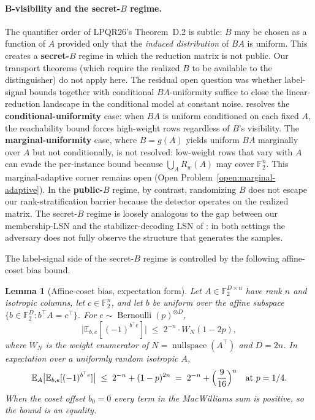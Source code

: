 \documentclass[11pt,a4paper]{article}
\theoremstyle{plain}
\newtheorem{lemma}[theorem]{Lemma}
\theoremstyle{definition}
\newcommand{\F}{\mathbb{F}}
\newcommand{\E}{\mathbb{E}}
\begin{document}
\paragraph{B-visibility and the secret-$B$ regime.} The quantifier order of LPQR26's Theorem~D.2 is subtle: $B$ may be chosen as a function of $A$ provided only that the \emph{induced distribution} of $BA$ is uniform. This creates a \textbf{secret-$B$} regime in which the reduction matrix is not public. Our transport theorems (which require the realized $B$ to be available to the distinguisher) do not apply here.  The residual open question was whether label-signal bounds together with conditional $BA$-uniformity suffice to close the linear-reduction landscape in the conditional model at constant noise.   resolves the \textbf{conditional-uniformity} case: when $BA$ is uniform conditioned on each fixed $A$, the reachability bound forces high-weight rows regardless of $B$'s visibility.  The \textbf{marginal-uniformity} case, where $B=g(A)$ yields uniform $BA$ marginally over $A$ but not conditionally, is not resolved: low-weight rows that vary with $A$ can evade the per-instance bound because $\bigcup_A R_w(A)$ may cover $\F_2^n$.  This marginal-adaptive corner remains open (Open Problem~\ref{open:marginal-adaptive}). In the \textbf{public-$B$} regime, by contrast, randomizing $B$ does not escape our rank-stratification barrier because the detector operates on the realized matrix. The secret-$B$ regime is loosely analogous to the gap between our membership-LSN and the stabilizer-decoding LSN of \cite{KLP+25,LPQR26}: in both settings the adversary does not fully observe the structure that generates the samples.

The label-signal side of the secret-$B$ regime is controlled by the following affine-coset bias bound.

\begin{lemma}[Affine-coset bias, expectation form]
\label{lem:affine-coset-bias}
Let $A \in \F_2^{D \times n}$ have rank $n$ and isotropic columns, let $c \in \F_2^n$, and let $b$ be uniform over the affine subspace $\{b \in \F_2^D : b^{\!\top} A = c^{\!\top}\}$. For $e \sim \operatorname{Bernoulli}(p)^{\otimes D}$,
\[
  \bigl|\E_{b,e}[(-1)^{b^{\!\top} e}]\bigr| \;\le\; 2^{-n} \cdot W_N(1-2p),
\]
where $W_N$ is the weight enumerator of $N = \operatorname{nullspace}(A^{\!\top})$ and $D = 2n$. In expectation over a uniformly random isotropic $A$,
\[
  \E_A\bigl|\E_{b,e}[(-1)^{b^{\!\top} e}]\bigr|
  \;\le\; 2^{-n} + (1-p)^{2n}
  \;=\; 2^{-n} + \Bigl(\frac{9}{16}\Bigr)^n \quad\text{at }p=1/4.
\]
When the coset offset $b_0=0$ every term in the MacWilliams sum is positive, so the bound is an equality.
\end{lemma}
\end{document}
